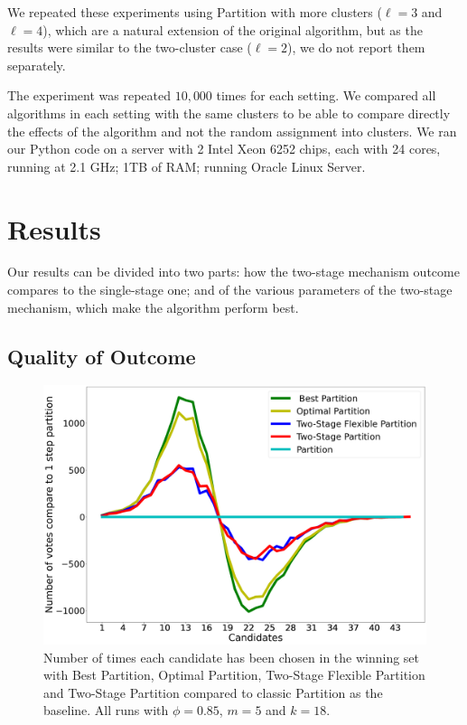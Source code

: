 \documentclass[letterpaper]{article} %
\begin{document}
We repeated these experiments using Partition with more clusters ($\ell=3$ and $\ell=4$), which are a natural extension of the original \citet{AFPT11} algorithm, but as the results were similar to the two-cluster case ($\ell=2$), we do not report them separately.

The experiment was repeated $10,000$ times for each setting. We compared all algorithms in each setting with the same clusters to be able to compare directly the effects of the algorithm and not the random assignment into clusters. We ran our Python code on a server with 2 Intel Xeon 6252 chips, each with 24 cores, running at 2.1 GHz; 1TB of RAM; running Oracle Linux Server.


\section{Results}\label{results}
Our results can be divided into two parts: how the two-stage mechanism outcome compares to the single-stage one; and of the various parameters of the two-stage mechanism, which make the algorithm perform best.




\subsection{Quality of Outcome}

\begin{figure}
\centering
\includegraphics[width=\columnwidth]{./images/candidates_results_18_winners_phi_0_85_last_new_new_new_new.png}
\caption{Number of times each candidate has been chosen in the winning set with Best Partition, Optimal Partition, Two-Stage Flexible Partition and Two-Stage Partition compared to classic Partition as the baseline. All runs with $\phi = 0.85$, $m = 5$ and $k = 18$.}
\label{fig:candidates-performances}
\end{figure}
\end{document}
